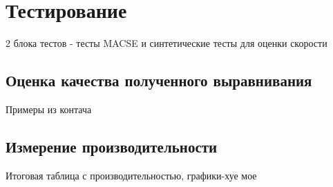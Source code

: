 \newpage

\section[Тестирование]{\large \centering Тестирование}
\hspace{\parindent} 2 блока тестов - тесты MACSE и синтетические тесты для оценки скорости

\subsection[Оценка качества полученного выравнивания]{\large Оценка качества полученного выравнивания}
\hspace{\parindent} Примеры из контача

\subsection[Измерение производительности]{\large Измерение производительности}
\hspace{\parindent} Итоговая таблица с производительностью, графики-хуе мое
